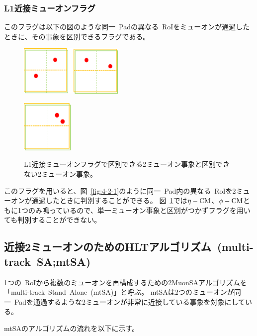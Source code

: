 \subsubsection{L1近接ミューオンフラグ}
このフラグは以下の図のような同一~Padの異なる~RoIをミューオンが通過したときに、その事象を区別できるフラグである。

\begin{figure}[H]
  \begin{minipage}[b]{0.5\linewidth}
      \centering
      \includegraphics[clip, width=5cm]{fig/4/isflaged.png}
      \label{fig:4-2-1}
  \end{minipage}
    \begin{minipage}[b]{0.45\linewidth}
      \centering
      \includegraphics[clip, width=2.5cm]{fig/4/isNotflaged.png}
      \label{fig:4-2-2}
  \end{minipage}
  \caption{L1近接ミューオンフラグで区別できる2ミューオン事象と区別できない2ミューオン事象。}
\end{figure}

このフラグを用いると、図~\ref{fig:4-2-1}のように同一~Pad内の異なる~RoIを2ミューオンが通過したときに判別することができる。
図~\ref{fig:4-2-2}では$\eta-\rm{CM}$、$\phi-\rm{CM}$ともに1つのみ鳴っているので、単一ミューオン事象と区別がつかずフラグを用いても判別することができない。

\subsection{近接2ミューオンのためのHLTアルゴリズム~(multi-track~SA;mtSA)}\label{chapter4-1-2}
1つの~RoIから複数のミューオンを再構成するための2MuonSAアルゴリズムを「multi-track~Stand~Alone~(mtSA)」と呼ぶ。
mtSAは2つのミューオンが同一~Padを通過するような2ミューオンが非常に近接している事象を対象にしている。

mtSAのアルゴリズムの流れを以下に示す。

